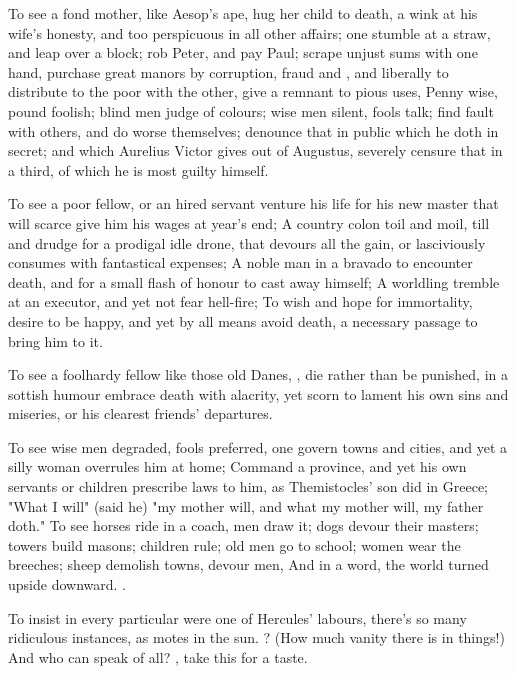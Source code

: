To see a fond mother, like Aesop's ape, hug her child to death, a
 wink at his wife's honesty, and too perspicuous in all
other affairs; one stumble at a straw, and leap over a block; rob Peter, and
pay Paul; scrape unjust sums with one hand, purchase great manors by
corruption, fraud and , and liberally to
distribute to the poor with the other, give a remnant to pious uses, \etc{}
Penny wise, pound foolish; blind men judge of colours; wise men silent, fools
talk; find fault with others, and do worse themselves;
denounce that in public which he doth in secret; and which
Aurelius Victor gives out of Augustus, severely censure that in a third, of
which he is most guilty himself.

To see a poor fellow, or an hired servant venture his life for his new master
that will scarce give him his wages at year's end; A country colon toil and
moil, till and drudge for a prodigal idle drone, that devours all the gain, or
lasciviously consumes with fantastical expenses; A noble man in a bravado to
encounter death, and for a small flash of honour to cast away himself; A
worldling tremble at an executor, and yet not fear hell-fire; To wish and hope
for immortality, desire to be happy, and yet by all means avoid death, a
necessary passage to bring him to it.

To see a foolhardy fellow like those old Danes, , die rather than be punished, in a sottish humour embrace death with
alacrity, yet scorn to lament his own sins and miseries, or
his clearest friends' departures.

To see wise men degraded, fools preferred, one govern towns and cities, and yet
a silly woman overrules him at home; Command a province,
and yet his own servants or children prescribe laws to him, as Themistocles'
son did in Greece; "What I will" (said he) "my mother will,
and what my mother will, my father doth." To see horses ride in a coach, men
draw it; dogs devour their masters; towers build masons; children rule; old men
go to school; women wear the breeches; sheep demolish
towns, devour men, \etc{} And in a word, the world turned upside downward.
.

To insist in every particular were one of Hercules'
labours, there's so many ridiculous instances, as motes in the sun. ? (How much vanity there is in things!) And who can speak of
all? , take this for a taste.

